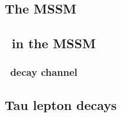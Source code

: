 %
\subsection*{The MSSM}

\subsection*{\HAtoTauTau\ in the MSSM}
%

\begin{frame}
\frametitle{\HAtoTauTau\ decay channel}

\begin{center}

\end{center}

\end{frame}

\subsection*{Tau lepton decays}
